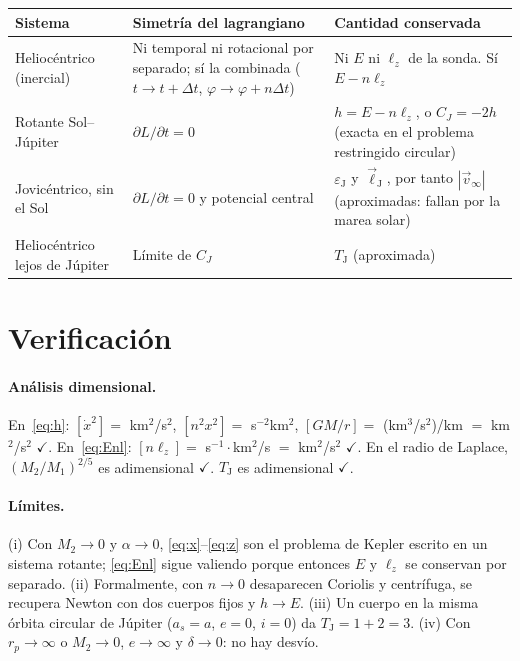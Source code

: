 \documentclass[12pt,letterpaper]{article}
\begin{document}
\begin{center}
\small
\begin{tabular}{>{\raggedright}p{3.3cm}>{\raggedright}p{4.4cm}>{\raggedright\arraybackslash}p{6.2cm}}
\toprule
Sistema & Simetría del lagrangiano & Cantidad conservada \\
\midrule
Heliocéntrico (inercial) & Ni temporal ni rotacional por separado; sí la combinada ($t\to t+\Delta t$, $\varphi\to\varphi+n\Delta t$) & Ni $E$ ni $\ell_z$ de la sonda. Sí $E-n\ell_z$ \\
\addlinespace
Rotante Sol--Júpiter & $\partial L/\partial t = 0$ & $h = E - n\ell_z$, o $C_J = -2h$ (exacta en el problema restringido circular) \\
\addlinespace
Jovicéntrico, sin el Sol & $\partial L/\partial t = 0$ y potencial central & $\varepsilon_{\mathrm J}$ y $\vec\ell_{\mathrm J}$, por tanto $|\vec v_\infty|$ (aproximadas: fallan por la marea solar) \\
\addlinespace
Heliocéntrico lejos de Júpiter & Límite de $C_J$ & $T_{\mathrm J}$ (aproximada) \\
\bottomrule
\end{tabular}
\end{center}

\section{Verificación}

\paragraph{Análisis dimensional.} En~\eqref{eq:h}: $[\dot x^2] = $ km$^2$/s$^2$,
$[n^2x^2] = $ s$^{-2}$km$^2$, $[GM/r] = $ (km$^3$/s$^2$)/km $=$ km$^2$/s$^2$ $\checkmark$.
En~\eqref{eq:Enl}: $[n\ell_z] = $ s$^{-1}\cdot$km$^2$/s $=$ km$^2$/s$^2$ $\checkmark$. En el radio de
Laplace, $(M_2/M_1)^{2/5}$ es adimensional $\checkmark$. $T_{\mathrm J}$ es adimensional $\checkmark$.

\paragraph{Límites.}
(i) Con $M_2\to 0$ y $\alpha\to 0$, \eqref{eq:x}--\eqref{eq:z} son el problema de Kepler escrito
en un sistema rotante; \eqref{eq:Enl} sigue valiendo porque entonces $E$ y $\ell_z$ se conservan
por separado.
(ii) Formalmente, con $n\to 0$ desaparecen Coriolis y centrífuga, se recupera Newton con dos
cuerpos fijos y $h\to E$.
(iii) Un cuerpo en la misma órbita circular de Júpiter ($a_s = a$, $e=0$, $i=0$) da
$T_{\mathrm J} = 1 + 2 = 3$.
(iv) Con $r_p\to\infty$ o $M_2\to 0$, $e\to\infty$ y $\delta\to 0$: no hay desvío.
\end{document}
